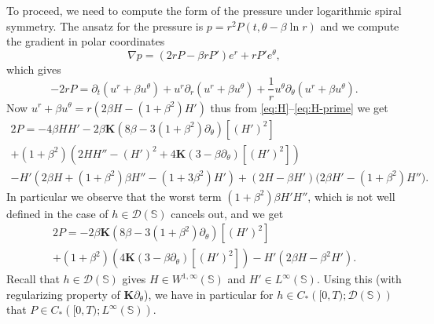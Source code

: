 \documentclass[JEP,XML,SOM,Unicode,NoFloatCountersInSection,published]{cedram}
\theoremstyle{plain}
\theoremstyle{definition}
\let\rd\partial
\let\nb\nabla
\let\bt\beta
\let\tht\theta
\newcommand{\bfK}{{\mathbf K}}
\newcommand{\bbS}{\mathbb S}
\newcommand{\calD}{\mathcal D}
\begin{document}
To proceed, we need to compute the form of the pressure under logarithmic spiral symmetry. The ansatz for the pressure is $p= r^2 P(t,\tht-\bt\ln r)$ and we compute the gradient in polar coordinates
\begin{equation*}
\nb p = (2rP-\beta r P') e^{r} + r P' e^{\tht},
\end{equation*}
which gives
\[
-2rP=\partial_t \left(u^r+\beta u^\theta\right)+u^r\partial_r\left(u^r+\beta u^\theta\right)+\frac{1}{r}u^\theta \partial_\theta(u^r+\beta u^\theta).
\]
Now $u^r+\beta u^\theta=r\left(2\beta H-(1+\beta^2) H' \right)$ thus from \eqref{eq:H}--\eqref{eq:H-prime} we get
\begin{multline*}
2P=-4\beta H H' -2\beta\bfK(8\bt - 3(1+\bt^2)\rd_\tht)\left[ (H')^2 \right]\\
+(1+\beta^2)\left(2H H''- (H')^2 + 4 \bfK (3-\bt\rd_\tht)\left[ (H')^2 \right]\right)\\
-H' \left(2\beta H+(1+\beta^2)\beta H'' -(1+3\beta^2)H' \right)+\left(2H-\beta H' \right)\bigl(2\beta H' -\left(1+\beta^2\right) H''\bigr).
\end{multline*}
In particular we observe that the worst term $(1+\beta^2)\beta H' H''$, which is not well defined in the case of $h\in \mathcal{D}\left(\mathbb{S}\right)$ cancels out, and we get
\begin{multline*}
2P=-2\beta\bfK(8\bt - 3(1+\bt^2)\rd_\tht)\left[ (H')^2 \right]\\
+(1+\beta^2)\left(4 \bfK (3-\bt\rd_\tht)\left[ (H')^2 \right]\right)
- H'(2\beta H-\beta^2 H').
\end{multline*}
Recall that $h \in \calD(\bbS)$ gives $H \in W^{1,\infty}(\bbS)$ and $H' \in L^\infty(\bbS)$. Using this (with regularizing property of $\bfK \rd_\tht$), we have in particular for $h\in C_*\left([0,T);\mathcal{D}\left(\mathbb{S}\right)\right)$ that $P\in C_*\left([0,T);L^\infty\left(\mathbb{S}\right)\right)$.
\end{document}
